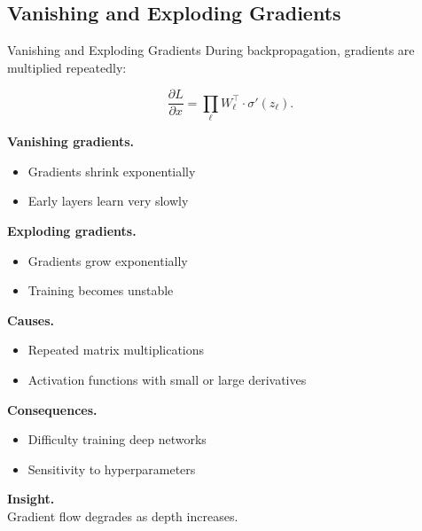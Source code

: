 \documentclass[aspectratio=169,11pt]{beamer}
\begin{document}
\subsection{Vanishing and Exploding Gradients}
\begin{frame}[t,allowframebreaks]{Vanishing and Exploding Gradients}
\small
During backpropagation, gradients are multiplied repeatedly:

\[
\frac{\partial L}{\partial x} =
\prod_{\ell} W_\ell^\top \cdot \sigma'(z_\ell).
\]

\textbf{Vanishing gradients.}\\ \begin{itemize}
    \item Gradients shrink exponentially
    \item Early layers learn very slowly
\end{itemize}

\textbf{Exploding gradients.}\\ \begin{itemize}
    \item Gradients grow exponentially
    \item Training becomes unstable
\end{itemize}

\textbf{Causes.}\\ \begin{itemize}
    \item Repeated matrix multiplications
    \item Activation functions with small or large derivatives
\end{itemize}

\textbf{Consequences.}\\ \begin{itemize}
    \item Difficulty training deep networks
    \item Sensitivity to hyperparameters
\end{itemize}

\textbf{Insight.}\\ Gradient flow degrades as depth increases.
\end{frame}
\end{document}
